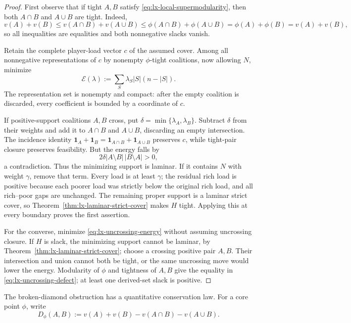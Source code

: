 \begin{proof}
First observe that if tight $A,B$ satisfy
\eqref{eq:lx-local-supermodularity}, then both $A\cap B$ and $A\cup B$ are
tight.  Indeed,
\[
 v(A)+v(B)\leq v(A\cap B)+v(A\cup B)
 \leq\phi(A\cap B)+\phi(A\cup B)
 =\phi(A)+\phi(B)=v(A)+v(B),
\]
so all inequalities are equalities and both nonnegative slacks vanish.

Retain the complete player-load vector $c$ of the assumed cover.  Among all
nonnegative representations of $c$ by nonempty
$\phi$-tight coalitions, now allowing $N$, minimize
\[
 \mathcal E(\lambda):=\sum_S\lambda_S|S|(n-|S|).      \tag{UE}
 \label{eq:lx-uncrossing-energy}
\]
The representation set is nonempty and compact: after the empty coalition is
discarded, every coefficient is bounded by a coordinate of $c$.

If positive-support coalitions $A,B$ cross, put
$\delta=\min\{\lambda_A,\lambda_B\}$.  Subtract $\delta$ from their weights
and add it to $A\cap B$ and $A\cup B$, discarding an empty intersection.
The incidence identity
$\mathbf1_A+\mathbf1_B=\mathbf1_{A\cap B}+\mathbf1_{A\cup B}$ preserves
$c$, while tight-pair closure preserves feasibility.  But the energy falls by
\[
 2\delta|A\setminus B|\,|B\setminus A|>0,             \tag{UE-D}
 \label{eq:lx-uncrossing-energy-drop}
\]
a contradiction.  Thus the minimizing support is laminar.  If it contains
$N$ with weight $\gamma$, remove that term.  Every load is at least $\gamma$;
the residual rich load is positive because each poorer load was strictly
below the original rich load, and all rich--poor gaps are unchanged.  The
remaining proper support is a laminar strict cover, so
Theorem~\ref{thm:lx-laminar-strict-cover} makes $H$ tight.  Applying this at
every boundary proves the first assertion.

For the converse, minimize \eqref{eq:lx-uncrossing-energy} without assuming
uncrossing closure.  If $H$ is slack, the minimizing support
cannot be laminar, by Theorem~\ref{thm:lx-laminar-strict-cover}; choose a
crossing positive pair $A,B$.  Their intersection and union cannot both be
tight, or the same uncrossing move would lower the energy.  Modularity of
$\phi$ and tightness of $A,B$ give the equality in
\eqref{eq:lx-uncrossing-defect}; at least one derived-set slack is positive.
\end{proof}

The broken-diamond obstruction has a quantitative conservation law.  For a
core point $\phi$, write
\[
 D_\phi(A,B):=v(A)+v(B)-v(A\cap B)-v(A\cup B).
\]

